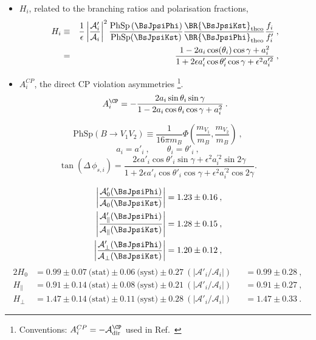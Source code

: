 
\begin{itemize}
\item $H_i$, related to the branching ratios and polarisation fractions,
\begin{eqnarray}\label{Eq:Hobs_Vector}
H_i & \equiv &  \frac{1}{\epsilon} \left|\frac{\mathcal{A}'_i}{\mathcal{A}_i}\right|^2
\frac{\text{PhSp}\left(\BsJpsiPhi\right)}{\text{PhSp}(\BsJpsiKst)}
\frac{\BR{\BsJpsiKst}_{\text{theo}}}{\BR{\BsJpsiPhi}_{\text{theo}}}
\frac{f_i}{f'_i}\:,  \\ 
  & = & \frac{1-2a_i \cos(\theta_i) \cos\gamma+a_i^{2}}{1+2\epsilon a'_i \cos\theta'_i\cos\gamma +\epsilon^2 a_i^{\prime 2}} \:, \nonumber
\end{eqnarray}
\item $A^{CP}_i$, the direct CP violation asymmetries%
\footnote{Conventions: $A^{CP}_i = -\mathcal{A}_{\text{dir}}^{\CP}$ used in Ref.~\cite{DeBruyn:2014oga}}.
\begin{equation}\label{eq:ACPpeng}
A^{\CP}_i= -\frac{2a_i\sin\theta_i\sin\gamma}{1-2a_i\cos\theta_i\cos\gamma+a_i^{2}}\:.
\end{equation}
\end{itemize}
\begin{equation}
\text{PhSp}(B\to V_1V_2) \equiv \frac{1}{16\pi m_B}\Phi\left(\frac{m_{V_1}}{m_B}, \frac{m_{V_2}}{m_B}\right)\:,
\end{equation}
\begin{equation}\label{Eq:penguin_relation}
a_i = a'_i\:,\qquad \theta_i = \theta'_i\:,
\end{equation}
\begin{equation}\label{tandelta}
\tan(\Delta\,\phi_{s,i}) = \frac{2\epsilon a'_i \cos\theta'_i \sin\gamma+\epsilon^2 a^{\prime 2}_i \sin2\gamma}{1+2\epsilon a'_i \cos\theta'_i \cos\gamma+ \epsilon^2 a^{\prime 2}_i \cos2\gamma}.
\end{equation}

\begin{align}
\left|\frac{\mathcal{A}'_0(\BsJpsiPhi)}{\mathcal{A}_0(\BsJpsiKst)}\right| & = 1.23 \pm 0.16\:,\label{Eq:AmpRat_JpsiKstar_long}\\
\left|\frac{\mathcal{A}'_{\parallel}(\BsJpsiPhi)}{\mathcal{A}_{\parallel}(\BsJpsiKst)}\right| & = 1.28 \pm 0.15\:,\\
\left|\frac{\mathcal{A}'_{\perp}(\BsJpsiPhi)}{\mathcal{A}_{\perp}(\BsJpsiKst)}\right| & = 1.20 \pm 0.12\:,\label{Eq:AmpRat_JpsiKstar_perp}
\end{align}
\begin{alignat}{2}
H_0 & = 0.99 \pm 0.07\:\text{(stat)} \pm 0.06\:\text{(syst)} \pm 0.27\:(|\mathcal{A}'_i/\mathcal{A}_i|) && = 0.99 \pm 0.28\:,\\
H_\parallel & = 0.91 \pm 0.14\:\text{(stat)} \pm 0.08\:\text{(syst)} \pm 0.21\:(|\mathcal{A}'_i/\mathcal{A}_i|) && = 0.91 \pm 0.27\:,\\
H_\perp & = 1.47 \pm 0.14\:\text{(stat)} \pm 0.11\:\text{(syst)} \pm 0.28\:(|\mathcal{A}'_i/\mathcal{A}_i|) && = 1.47 \pm 0.33\:.
\end{alignat}

